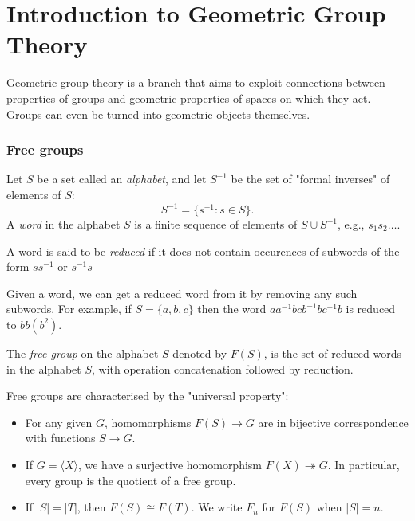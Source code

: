 \documentclass[10pt]{article}
\begin{document}
    \part{Introduction to Geometric Group Theory}
    Geometric group theory is a branch that aims to exploit connections between properties of groups and geometric properties of spaces on which they act. Groups can even be turned into geometric objects themselves.
    \section{Free groups}
    Let $S$ be a set called an \textit{alphabet}, and let $ S^{-1} $ be the set of "formal inverses" of elements of $S$: 
    \[
        S^{-1}=\{s^{-1}:s\in S\}.
    \]
    A \textit{word} in the alphabet $S$ is a finite sequence of elements of $S\cup S^{-1}$, e.g., $s_1s_2\dots$.

    A word is said to be \textit{reduced} if it does not contain occurences of subwords of the form $ss^{-1}$ or $s^{-1}s$

    Given a word, we can get a reduced word from it by removing any such subwords. For example, if $ S=\{a,b,c\} $ then the word $ aa^{-1}bcb^{-1}bc^{-1}b $ is reduced to $bb(b^2)$.
    \begin{definition}
        The \textit{free group} on the alphabet $S$ denoted by $ F(S) $, is the set of reduced words in the alphabet $S$, with operation concatenation followed by reduction.
    \end{definition}

    Free groups are characterised by the "universal property":
    \begin{proposition}
        \begin{itemize}
            \item For any given $G$, homomorphisms $F(S)\to G$ are in bijective correspondence with functions $ S \to G $.
            \item If $G=\langle X \rangle $, we have a surjective homomorphism $ F(X) \twoheadrightarrow G $. In particular, every group is the quotient of a free group.
            \item If $ |S|=|T| $, then $ F(S)\cong F(T) $. We write $ F_n $ for $F(S)$ when $|S|=n$.
        \end{itemize}
    \end{proposition}
\end{document}
